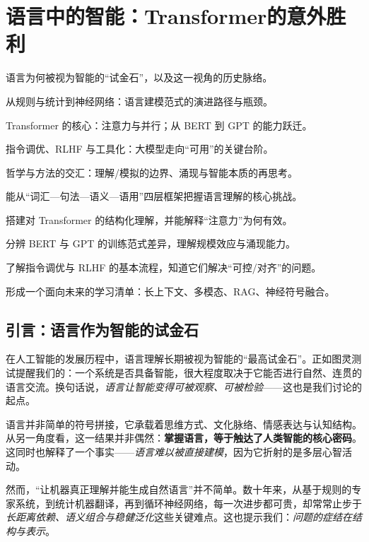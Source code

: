 \chapter{语言中的智能：Transformer的意外胜利}

\begin{introduction}
  \item 语言为何被视为智能的“试金石”，以及这一视角的历史脉络。
  \item 从规则与统计到神经网络：语言建模范式的演进路径与瓶颈。
  \item Transformer 的核心：注意力与并行；从 BERT 到 GPT 的能力跃迁。
  \item 指令调优、RLHF 与工具化：大模型走向“可用”的关键台阶。
  \item 哲学与方法的交汇：理解/模拟的边界、涌现与智能本质的再思考。
\end{introduction}

\begin{introduction}
  \item 能从“词汇—句法—语义—语用”四层框架把握语言理解的核心挑战。
  \item 搭建对 Transformer 的结构化理解，并能解释“注意力”为何有效。
  \item 分辨 BERT 与 GPT 的训练范式差异，理解规模效应与涌现能力。
  \item 了解指令调优与 RLHF 的基本流程，知道它们解决“可控/对齐”的问题。
  \item 形成一个面向未来的学习清单：长上下文、多模态、RAG、神经符号融合。
\end{introduction}

\section{引言：语言作为智能的试金石}

在人工智能的发展历程中，语言理解长期被视为智能的“最高试金石”。正如图灵测试提醒我们的：一个系统是否具备智能，很大程度取决于它能否进行自然、连贯的语言交流。换句话说，\emph{语言让智能变得可被观察、可被检验}——这也是我们讨论的起点。

语言并非简单的符号拼接，它承载着思维方式、文化脉络、情感表达与认知结构。从另一角度看，这一结果并非偶然：\textbf{掌握语言，等于触达了人类智能的核心密码}。这同时也解释了一个事实——\emph{语言难以被直接建模}，因为它折射的是多层心智活动。

然而，“让机器真正理解并能生成自然语言”并不简单。数十年来，从基于规则的专家系统，到统计机器翻译，再到循环神经网络，每一次进步都可贵，却常常止步于\emph{长距离依赖、语义组合与稳健泛化}这些关键难点。这也提示我们：\emph{问题的症结在结构与表示}。

